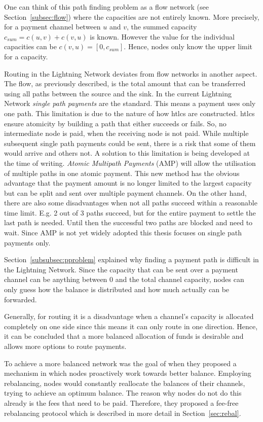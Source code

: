 \documentclass[final]{fhnwreport}       %
\begin{document}
One can think of this path finding problem as a flow network (see Section~\ref{subsec:flow}) where the capacities are not entirely known. More precisely, for a payment channel between $u$ and $v$, the summed capacity $c_{sum} = c(u,v) + c(v,u)$ is known. However the value for the individual capacities can be $c(v,u) = [0, c_{sum}]$. Hence, nodes only know the upper limit for a capacity. 

Routing in the Lightning Network deviates from flow networks in another aspect. The flow, as previously described, is the total amount that can be transferred using all paths between the source and the sink. In the current Lightning Network \emph{single path payments} are the standard. This means a payment uses only one path. This limitation is due to the nature of how \glspl{htlc} are constructed. \glspl{htlc} ensure atomicity by building a path that either succeeds or fails. So, no intermediate node is paid, when the receiving node is not paid. While multiple subsequent single path payments could be sent, there is a risk that some of them would arrive and others not. A solution to this limitation is being developed at the time of writing. \emph{Atomic Multipath Payments} (AMP) will allow the utilisation of multiple paths in one atomic payment. This new method has the obvious advantage that the payment amount is no longer limited to the largest capacity but can be split and sent over multiple payment channels. On the other hand, there are also some disadvantages when not all paths succeed within a reasonable time limit. E.g. 2 out of 3 paths succeed, but for the entire payment to settle the last path is needed. Until then the successful two paths are blocked and need to wait. Since AMP is not yet widely adopted this thesis focuses on single path payments only.

Section~\ref{subsubsec:pproblem} explained why finding a payment path is difficult in the Lightning Network. Since the capacity that can be sent over a payment channel can be anything between 0 and the total channel capacity, nodes can only guess how the balance is distributed and how much actually can be forwarded. 

Generally, for routing it is a disadvantage when a channel's capacity is allocated completely on one side since this means it can only route in one direction. Hence, it can be concluded that a more balanced allocation of funds is desirable and allows more options to route payments.

To achieve a more balanced network was the goal of \textcite{pickhardt_imbalance_2019} when they proposed a mechanism in which nodes proactively work towards better balance. Employing rebalancing, nodes would constantly reallocate the balances of their channels, trying to achieve an optimum balance. The reason why nodes do not do this already is the fees that need to be paid. Therefore, they proposed a fee-free rebalancing protocol which is described in more detail in Section~\ref{sec:rebal}.
\end{document}

